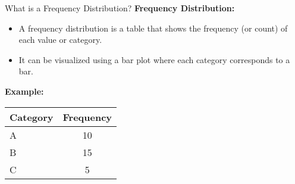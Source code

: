 \documentclass[handout]{beamer} %
\begin{document}
\begin{frame}{What is a Frequency Distribution?}
    \textbf{Frequency Distribution:}
    \begin{itemize}
        \item A frequency distribution is a table that shows the frequency (or count) of each value or category.
        \item It can be visualized using a bar plot where each category corresponds to a bar.
    \end{itemize}
    
    \vspace{0.5cm}
    \textbf{Example:}
    \begin{center}
        \begin{tabular}{lc}
            \toprule
            \textbf{Category} & \textbf{Frequency} \\
            \midrule
            A & 10 \\
            B & 15 \\
            C & 5 \\
            \bottomrule
        \end{tabular}
    \end{center}
    
\end{frame}
\end{document}
